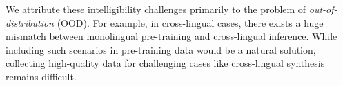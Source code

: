 \documentclass[11pt]{article}
\begin{document}


We attribute these intelligibility challenges primarily to the problem of \textit{out-of-distribution} (OOD). For example, in cross-lingual cases, there exists a huge mismatch between monolingual pre-training and cross-lingual inference. While including such scenarios in pre-training data would be a natural solution, collecting high-quality data for challenging cases like cross-lingual synthesis remains difficult. 
\end{document}
